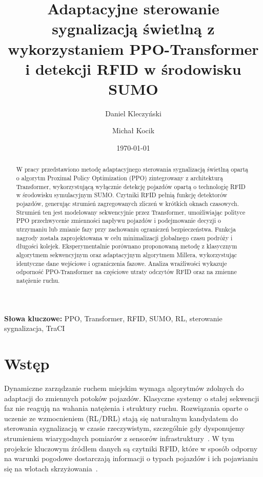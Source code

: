 \documentclass[12pt,a4paper]{article}
\title{Adaptacyjne sterowanie sygnalizacją świetlną z wykorzystaniem PPO-Transformer i detekcji RFID w środowisku SUMO}
\author{Daniel Kleczyński \and Michał Kocik}
\date{\today}
\begin{document}

\maketitle

\begin{abstract}
W pracy przedstawiono metodę adaptacyjnego sterowania sygnalizacją świetlną opartą o algorytm Proximal Policy Optimization (PPO) zintegrowany z architekturą Transformer, wykorzystującą wyłącznie detekcję pojazdów opartą o technologię RFID w środowisku symulacyjnym SUMO. Czytniki RFID pełnią funkcję detektorów pojazdów, generując strumień zagregowanych zliczeń w krótkich oknach czasowych. Strumień ten jest modelowany sekwencyjnie przez Transformer, umożliwiając polityce PPO przechwycenie zmienności napływu pojazdów i podejmowanie decyzji o utrzymaniu lub zmianie fazy przy zachowaniu ograniczeń bezpieczeństwa. Funkcja nagrody została zaprojektowana w celu minimalizacji globalnego czasu podróży i długości kolejek. Eksperymentalnie porównano proponowaną metodę z klasycznym algorytmem sekwencyjnym oraz adaptacyjnym algorytmem Millera, wykorzystując identyczne dane wejściowe i ograniczenia fazowe. Analiza wrażliwości wykazuje odporność PPO-Transformer na częściowe utraty odczytów RFID oraz na zmienne natężenie ruchu.
\end{abstract}

\textbf{Słowa kluczowe:} PPO, Transformer, RFID, SUMO, RL, sterowanie sygnalizacja, TraCI

\section{Wstęp}

Dynamiczne zarządzanie ruchem miejskim wymaga algorytmów zdolnych do adaptacji do zmiennych potoków pojazdów. Klasyczne systemy o stałej sekwencji faz nie reagują na wahania natężenia i struktury ruchu. Rozwiązania oparte o uczenie ze wzmocnieniem (RL/DRL) stają się naturalnym kandydatem do sterowania sygnalizacją w czasie rzeczywistym, szczególnie gdy dysponujemy strumieniem wiarygodnych pomiarów z sensorów infrastruktury~\cite{ref1,ref2}. W tym projekcie kluczowym źródłem danych są czytniki RFID, które w sposób odporny na warunki pogodowe dostarczają informacji o typach pojazdów i ich pojawianiu się na wlotach skrzyżowania~\cite{ref3}.
\end{document}
